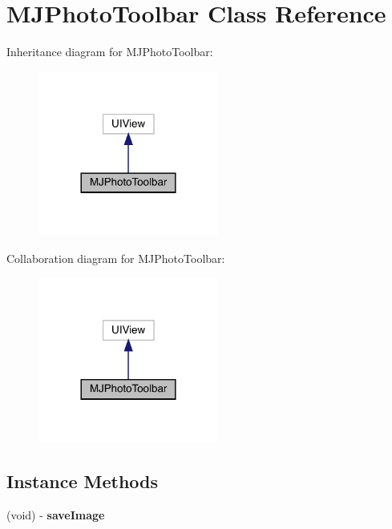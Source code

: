 \hypertarget{interface_m_j_photo_toolbar}{}\section{M\+J\+Photo\+Toolbar Class Reference}
\label{interface_m_j_photo_toolbar}


Inheritance diagram for M\+J\+Photo\+Toolbar\+:\nopagebreak
\begin{figure}[H]
\begin{center}
\leavevmode
\includegraphics[width=168pt]{interface_m_j_photo_toolbar__inherit__graph}
\end{center}
\end{figure}


Collaboration diagram for M\+J\+Photo\+Toolbar\+:\nopagebreak
\begin{figure}[H]
\begin{center}
\leavevmode
\includegraphics[width=168pt]{interface_m_j_photo_toolbar__coll__graph}
\end{center}
\end{figure}
\subsection*{Instance Methods}
\begin{DoxyCompactItemize}
\item 
\mbox{\label{interface_m_j_photo_toolbar_a4e774c6950d457bce479bc4428e78aff}} 
(void) -\/ {\bfseries save\+Image}
\end{DoxyCompactItemize}
